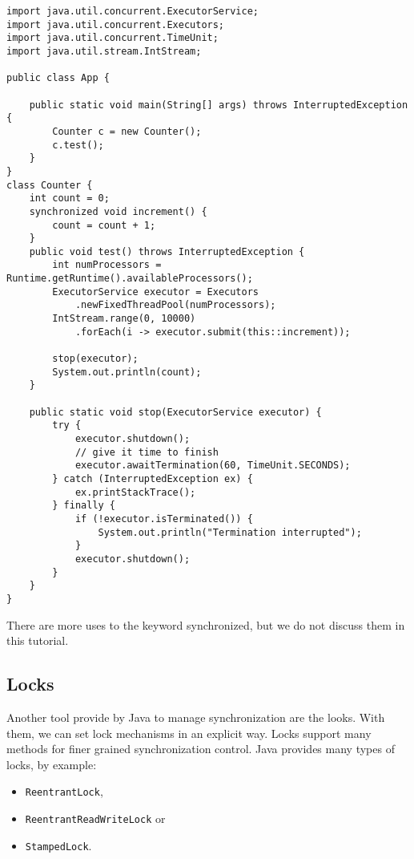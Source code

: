 \documentclass{latex/classes/myarticle}
\begin{document}
\begin{lstlisting}
import java.util.concurrent.ExecutorService;
import java.util.concurrent.Executors;
import java.util.concurrent.TimeUnit;
import java.util.stream.IntStream;

public class App {

    public static void main(String[] args) throws InterruptedException {
        Counter c = new Counter();
        c.test();
    }
}
class Counter {
    int count = 0;
    synchronized void increment() {
        count = count + 1;
    }
    public void test() throws InterruptedException {
        int numProcessors = Runtime.getRuntime().availableProcessors();
        ExecutorService executor = Executors
            .newFixedThreadPool(numProcessors);
        IntStream.range(0, 10000)
            .forEach(i -> executor.submit(this::increment));

        stop(executor);
        System.out.println(count);
    }

    public static void stop(ExecutorService executor) {
        try {
            executor.shutdown();
            // give it time to finish
            executor.awaitTermination(60, TimeUnit.SECONDS);
        } catch (InterruptedException ex) {
            ex.printStackTrace();
        } finally {
            if (!executor.isTerminated()) {
                System.out.println("Termination interrupted");
            }
            executor.shutdown();
        }
    }
}
\end{lstlisting}

There are more uses to the keyword synchronized, but we do not discuss them
in this tutorial.


\subsection{Locks}
\label{sec:orgf5eba2b}


Another tool provide by Java to manage synchronization are the looks. With
them, we can set lock mechanisms in an explicit way. Locks support many
methods for finer grained synchronization control. Java provides many types
of locks, by  example:
\begin{itemize}
\item \texttt{ReentrantLock},
\item \texttt{ReentrantReadWriteLock} or
\item \texttt{StampedLock}.
\end{itemize}
\end{document}
